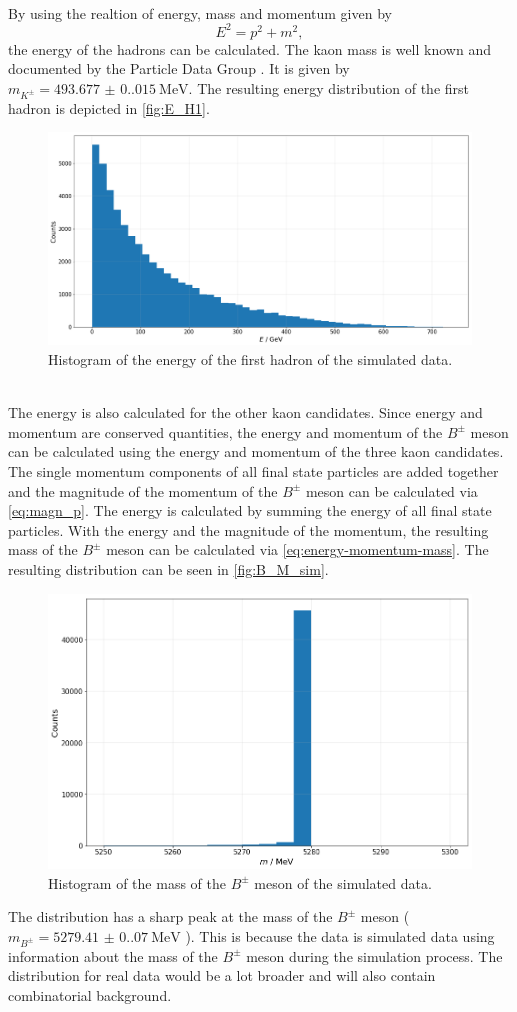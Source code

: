 \\ By using the realtion of energy, mass and momentum given by 
\begin{equation}
  \label{eq:energy-momentum-mass}
  E^2 = p^2 + m^2,
\end{equation}
the energy of the hadrons can be calculated. The kaon mass is well known and documented by the Particle Data Group \cite{PDG}.
It is given by $m_{K^{\pm}} = \qty{493.677(0.015)}{\mega\electronvolt}$. The resulting energy distribution of the first hadron is depicted in  \autoref{fig:E_H1}.
\begin{figure}
  \centering
  \includegraphics[width = .7\textwidth]{"content/pics/E_H1.png"}
  \caption{Histogram of the energy of the first hadron of the simulated data.}
  \label{fig:E_H1}
\end{figure}
\\The energy is also calculated for the other kaon candidates. Since energy and momentum are conserved quantities, the energy and momentum of the $B^{\pm}$ meson can be calculated
using the energy and momentum of the three kaon candidates. The single momentum components of all final state particles are added together and the magnitude of the momentum of the $B^{\pm}$
meson can be calculated via \autoref{eq:magn_p}. The energy is calculated by summing the energy of all final state particles. With the energy and the magnitude of the momentum, the resulting
mass of the $B^{\pm}$ meson can be calculated via \autoref{eq:energy-momentum-mass}. The resulting distribution can be seen in \autoref{fig:B_M_sim}.
\begin{figure}
  \centering
  \includegraphics[width = .6\textwidth]{"content/pics/B_M_sim.png"}
  \caption{Histogram of the mass of the $B^{\pm}$ meson of the simulated data.}
  \label{fig:B_M_sim}
\end{figure}
The distribution has a sharp peak at the mass of the $B^{\pm}$ meson ($m_{B^{\pm}} = \qty{5279.41(0.07)}{\mega\electronvolt}$ \cite{PDG}). This is because the data is simulated data using information about the mass of the $B^{\pm}$ meson during
the simulation process. The distribution for real data would be a lot broader and will also contain combinatorial background.

